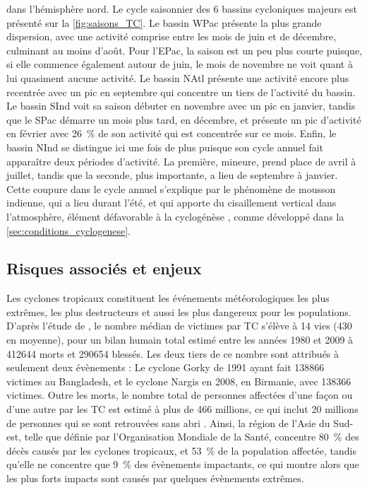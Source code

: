 \documentclass[../main.tex]{subfiles}
\begin{document}
dans l'hémisphère nord. Le cycle saisonnier des \num{6} bassins cycloniques majeurs est présenté sur la \cref{fig:saisons_TC}. Le bassin WPac présente la plus
grande dispersion, avec une activité comprise entre les mois de juin et de décembre, culminant au moins d'août. Pour l'EPac, la saison est un peu plus courte
puisque, si elle commence également autour de juin, le mois de novembre ne voit quant à lui quasiment aucune activité. Le bassin NAtl présente une activité
encore plus recentrée avec un pic en septembre qui concentre un tiers de l'activité du bassin. Le bassin SInd voit sa saison débuter en novembre avec un pic en
janvier, tandis que le SPac démarre un mois plus tard, en décembre, et présente un pic d'activité en février avec \SI{26}{\percent} de son activité qui est
concentrée sur ce mois. Enfin, le bassin NInd se distingue ici une fois de plus puisque son cycle annuel fait apparaître deux périodes d'activité. La première,
mineure, prend place de avril à juillet, tandis que la seconde, plus importante, a lieu de septembre à janvier. Cette coupure dans le cycle annuel s'explique
par le phénomène de mousson indienne, qui a lieu durant l'été, et qui apporte du cisaillement vertical dans l'atmosphère, élément défavorable à la cyclogénèse
\parencite{gray_global_1968}, comme développé dans la \cref{sec:conditions_cyclogenese}.

\subsection{Risques associés et enjeux}\label{sec:risques}

Les cyclones tropicaux constituent les événements météorologiques les plus extrêmes, les plus destructeurs et aussi les plus dangereux pour les populations.
D'après l'étude de \cite{doocy_human_2013}, le nombre médian de victimes par TC s'élève à \num{14} vies (\num{430} en moyenne), pour un bilan humain total
estimé entre les années 1980 et 2009 à \num{412644} morts et \num{290654} blessés. Les deux tiers de ce nombre sont attribués à seulement deux évènements : Le
cyclone Gorky de 1991 ayant fait \num{138866} victimes au Bangladesh, et le cyclone Nargis en 2008, en Birmanie, avec \num{138366} victimes. Outre les morts, le
nombre total de personnes affectées d'une façon ou d'une autre par les TC est estimé à plus de \num{466} millions, ce qui inclut \num{20} millions de personnes
qui se sont retrouvées sans abri \parencite{doocy_human_2013}. Ainsi, la région de l'Asie du Sud-est, telle que définie par l'Organisation Mondiale de la Santé,
concentre \SI{80}{\percent} des décès causés par les cyclones tropicaux, et \SI{53}{\percent} de la population affectée, tandis qu'elle ne concentre que
\SI{9}{\percent} des évènements impactants, ce qui montre alors que les plus forts impacts sont causés par quelques évènements extrêmes.
\end{document}
